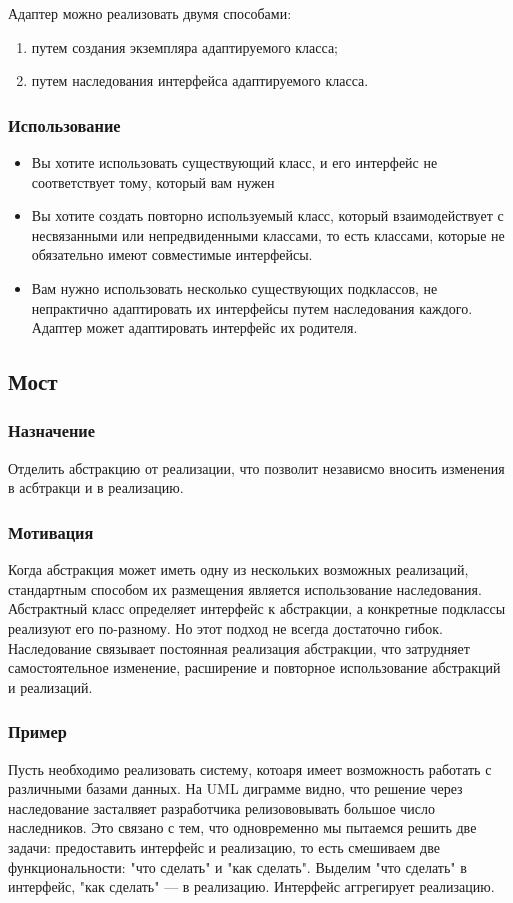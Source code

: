 \documentclass[10pt]{article}
\begin{document}
Адаптер можно реализовать двумя способами:
\begin{enumerate}
	\item путем создания экземпляра адаптируемого класса;
	\item путем наследования интерфейса адаптируемого класса.
\end{enumerate}

\subsubsection{Использование}
\begin{itemize}
	\item Вы хотите использовать существующий класс, и его интерфейс не соответствует тому, 
		который вам нужен
	\item Вы хотите создать повторно используемый класс, который взаимодействует с
		несвязанными или непредвиденными классами, то есть классами, которые не обязательно
		имеют совместимые интерфейсы. 
	\item Вам нужно использовать несколько существующих подклассов, не непрактично адаптировать их
		интерфейсы путем наследования каждого. Адаптер может адаптировать интерфейс их родителя.
\end{itemize}

\subsection{Мост}
\subsubsection{Назначение}
Отделить абстракцию от реализации, что позволит независмо вносить изменения
в асбтракци и в реализацию.

\subsubsection{Мотивация}
Когда абстракция может иметь одну из нескольких возможных реализаций,
стандартным способом их размещения является использование наследования.
Абстрактный класс определяет интерфейс к абстракции, а конкретные подклассы
реализуют его по-разному. Но этот подход не всегда достаточно гибок. Наследование связывает
постоянная реализация абстракции, что затрудняет самостоятельное изменение, расширение и повторное использование абстракций и реализаций.

\subsubsection{Пример}
Пусть необходимо реализовать систему, котоаря имеет возможность работать с различными базами
данных. На UML диграмме видно, что решение через наследование засталвяет разработчика
релизововывать большое число наследников. Это связано с тем, что одновременно мы пытаемся решить
две задачи: предоставить интерфейс и реализацию, то есть смешиваем две функциональности: "что сделать"
и "как сделать". Выделим "что сделать" в интерфейс, "как сделать" --- в реализацию. Интерфейс аггрегирует
реализацию.
\end{document}
